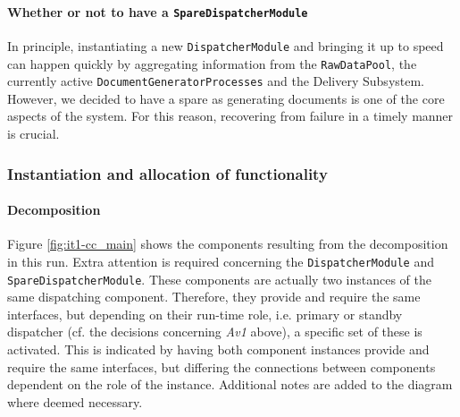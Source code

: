 \documentclass[a4paper,10pt]{article}
\begin{document}
\paragraph{Whether or not to have a \texttt{SpareDispatcherModule}}
In principle, instantiating a new \texttt{DispatcherModule} and bringing it up to speed can happen quickly by aggregating information from the \texttt{RawDataPool}, the currently active \texttt{DocumentGeneratorProcesses} and the Delivery Subsystem. However, we decided to have a spare as generating documents is one of the core aspects of the system. For this reason, recovering from failure in a timely manner is crucial.

\subsubsection{Instantiation and allocation of functionality}
\paragraph{Decomposition}
Figure \ref{fig:it1-cc_main} shows the components resulting from the decomposition in this run. Extra attention is required concerning the \texttt{DispatcherModule} and \texttt{SpareDispatcherModule}. These components are actually two instances of the same dispatching component. Therefore, they provide and require the same interfaces, but depending on their run-time role, i.e. primary or standby dispatcher (cf. the decisions concerning \emph{Av1} above), a specific set of these is activated. This is indicated by having both component instances provide and require the same interfaces, but differing the connections between components dependent on the role of the instance. Additional notes are added to the diagram where deemed necessary.
\end{document}
